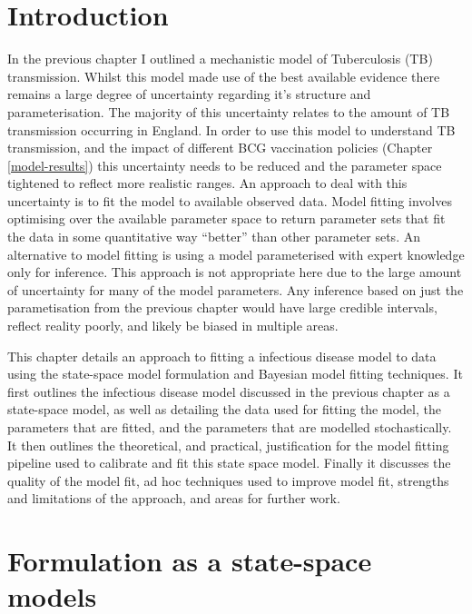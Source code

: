 \documentclass[11pt,twoside]{bristolthesis}
\begin{document}
  \hypertarget{introduction-7}{%
  \section{Introduction}\label{introduction-7}}
  
  In the previous chapter I outlined a mechanistic model of Tuberculosis (TB) transmission. Whilst this model made use of the best available evidence there remains a large degree of uncertainty regarding it's structure and parameterisation. The majority of this uncertainty relates to the amount of TB transmission occurring in England. In order to use this model to understand TB transmission, and the impact of different BCG vaccination policies (Chapter \ref{model-results}) this uncertainty needs to be reduced and the parameter space tightened to reflect more realistic ranges. An approach to deal with this uncertainty is to fit the model to available observed data. Model fitting involves optimising over the available parameter space to return parameter sets that fit the data in some quantitative way ``better'' than other parameter sets. An alternative to model fitting is using a model parameterised with expert knowledge only for inference. This approach is not appropriate here due to the large amount of uncertainty for many of the model parameters. Any inference based on just the parametisation from the previous chapter would have large credible intervals, reflect reality poorly, and likely be biased in multiple areas.
  
  This chapter details an approach to fitting a infectious disease model to data using the state-space model formulation and Bayesian model fitting techniques. It first outlines the infectious disease model discussed in the previous chapter as a state-space model, as well as detailing the data used for fitting the model, the parameters that are fitted, and the parameters that are modelled stochastically. It then outlines the theoretical, and practical, justification for the model fitting pipeline used to calibrate and fit this state space model. Finally it discusses the quality of the model fit, ad hoc techniques used to improve model fit, strengths and limitations of the approach, and areas for further work.
  
  \hypertarget{formulation-as-a-state-space-models}{%
  \section{Formulation as a state-space models}\label{formulation-as-a-state-space-models}}
  
\end{document}
